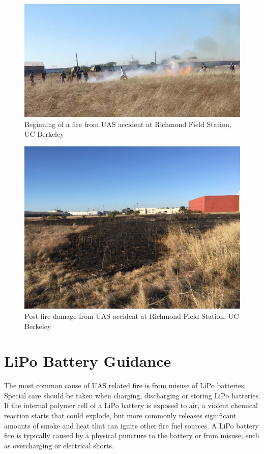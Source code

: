\documentclass[
]{book}
\begin{document}
\begin{figure}

{\centering \includegraphics[width=0.75\linewidth]{images/fire_start} 

}

\caption{Beginning of a fire from UAS accident at Richmond Field Station, UC Berkeley}\label{fig:fire-start}
\end{figure}

\begin{figure}

{\centering \includegraphics[width=0.75\linewidth]{images/fire_damage} 

}

\caption{Post fire damage from UAS accident at Richmond Field Station, UC Berkeley}\label{fig:fire-damage}
\end{figure}

\hypertarget{lipo-battery-guidance}{%
\section{LiPo Battery Guidance}\label{lipo-battery-guidance}}

The most common cause of UAS related fire is from misuse of LiPo batteries. Special care should be taken when charging, discharging or storing LiPo batteries. If the internal polymer cell of a LiPo battery is exposed to air, a violent chemical reaction starts that could explode, but more commonly releases significant amounts of smoke and heat that can ignite other fire fuel sources. A LiPo battery fire is typically caused by a physical puncture to the battery or from misuse, such as overcharging or electrical shorts.
\end{document}
